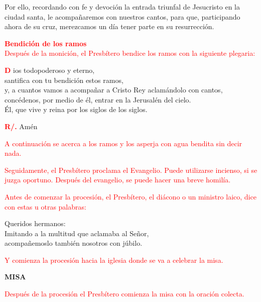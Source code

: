 \documentclass[12pt, letterpaper]{report}
\begin{document}
	\Large {Por ello, recordando con fe y devoción la entrada triunfal de Jesucristo en la ciudad santa, le acompañaremos con nuestros cantos, para que, participando ahora de su cruz, merezcamos un día tener parte en su resurrección.}

	\newpage

	\Large {\bfseries \textcolor{red}{Bendición de los ramos}}\\
	\large {\textcolor{red}{Después de la monición, el Presbítero bendice los ramos con la siguiente plegaria:}}

	\noindent
	\lettrine[lines=2]{\bfseries \textcolor{red}{D}}{} \Large {ios todopoderoso y eterno,\\
	santifica con tu} \Huge{\textcolor{red}{}}  \Large{bendición estos ramos,\\
	y, a cuantos vamos a acompañar a Cristo Rey aclamándolo con cantos,\\
	concédenos, por medio de él, entrar en la Jerusalén del cielo.\\
	Él, que vive y reina por los siglos de los siglos.}

	\noindent
	\Large {\bfseries \textcolor{red}{R/.}} \hspace{1cm} Am\'en

	\large {\textcolor{red}{A continuación se acerca a los ramos y los asperja con agua bendita sin decir nada.}}

	\large {\textcolor{red}{Seguidamente, el Presbítero proclama el Evangelio. Puede utilizarse incienso, si se juzga oportuno. Después del evangelio, se puede hacer una breve homilía.}}

	\large {\textcolor{red}{Antes de comenzar la procesión, el Presbítero, el diácono o un ministro laico, dice con estas u otras palabras:}}

	\Large {Queridos hermanos:\\
	Imitando a la multitud que aclamaba al Señor, \\
	acompañemoslo también nosotros con júbilo.}

	\large {\textcolor{red}{Y comienza la procesión hacia la iglesia donde se va a celebrar la misa.}}

	\newpage

	\begin{center}
	\Huge {\bfseries MISA}
	\end{center}

	\large {\textcolor{red}{Después de la procesión el Presbítero comienza la misa con la oración colecta.}}
\end{document}
